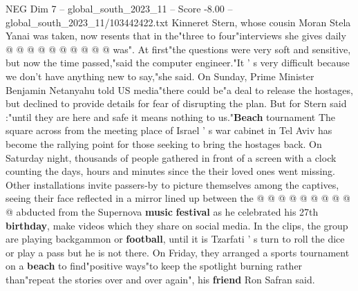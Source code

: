 \begin{textsample}{NEG Dim 7 – global\_south\_2023\_11 – Score -8.00 – global\_south\_2023\_11/103442422.txt}
Kinneret Stern, whose cousin Moran Stela Yanai was taken, now resents that in the"three to four"interviews she gives daily @ @ @ @ @ @ @ @ @ @ was".
At first"the questions were very soft and sensitive, but now the time passed,"said the computer engineer."It ' s very difficult because we don't have anything new to say,"she said.
On Sunday, Prime Minister Benjamin Netanyahu told US media"there could be"a deal to release the hostages, but declined to provide details for fear of disrupting the plan.
But for Stern said :"until they are here and safe it means nothing to us."\textbf{Beach} tournament The square across from the meeting place of Israel ' s war cabinet in Tel Aviv has become the rallying point for those seeking to bring the hostages back.
On Saturday night, thousands of people gathered in front of a screen with a clock counting the days, hours and minutes since the their loved ones went missing.
Other installations invite passers-by to picture themselves among the captives, seeing their face reflected in a mirror lined up between the @ @ @ @ @ @ @ @ @ @ abducted from the Supernova \textbf{music} \textbf{festival} as he celebrated his 27th \textbf{birthday}, make videos which they share on social media.
In the clips, the group are playing backgammon or \textbf{football}, until it is Tzarfati ' s turn to roll the dice or play a pass but he is not there.
On Friday, they arranged a sports tournament on a \textbf{beach} to find"positive ways"to keep the spotlight burning rather than"repeat the stories over and over again", his \textbf{friend} Ron Safran said.

\end{textsample}
